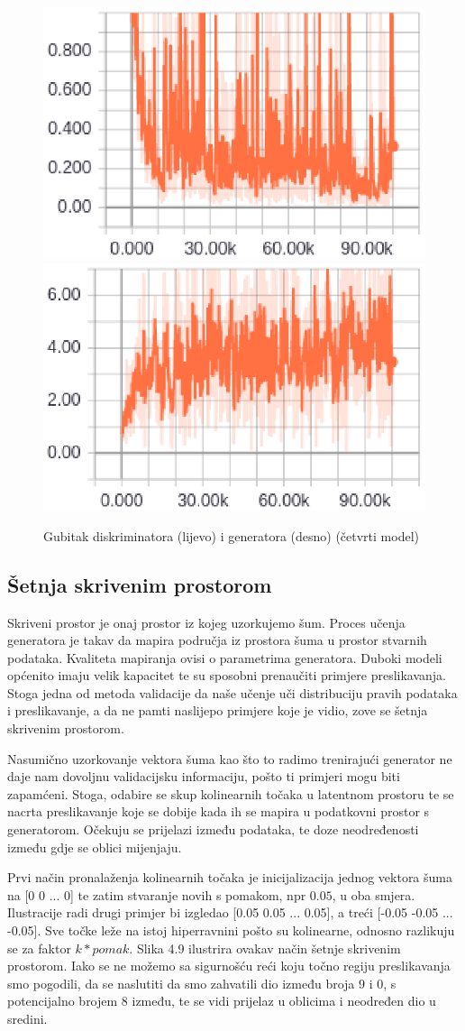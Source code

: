 \documentclass[times, utf8, diplomski]{fer}
\begin{document}
\begin{figure}[H]
\begin{center}
\includegraphics[width=.4\textwidth]{dcgandiscloss}
\includegraphics[width=.4\textwidth]{dcgangenloss}
\end{center}
\caption{Gubitak diskriminatora (lijevo) i generatora (desno) (četvrti model)}
\end{figure}

\subsection{Šetnja skrivenim prostorom}
Skriveni prostor je onaj prostor iz kojeg uzorkujemo šum. Proces učenja generatora je takav da mapira područja iz prostora šuma u prostor stvarnih podataka. Kvaliteta mapiranja ovisi o parametrima generatora. Duboki modeli općenito imaju velik kapacitet te su sposobni prenaučiti primjere preslikavanja. Stoga jedna od metoda validacije da naše učenje uči distribuciju pravih podataka i preslikavanje, a da ne pamti naslijepo primjere koje je vidio, zove se šetnja skrivenim prostorom. \par

Nasumično uzorkovanje vektora šuma kao što to radimo trenirajući generator ne daje nam dovoljnu validacijsku informaciju, pošto ti primjeri mogu biti zapamćeni. Stoga, odabire se skup kolinearnih točaka u latentnom prostoru te se nacrta preslikavanje koje se dobije kada ih se mapira u podatkovni prostor s generatorom. Očekuju se prijelazi između podataka, te doze neodređenosti između gdje se oblici mijenjaju. \par

Prvi način pronalaženja kolinearnih točaka je inicijalizacija jednog vektora šuma na [0 0 ... 0] te zatim stvaranje novih s pomakom, npr $0.05$, u oba smjera. Ilustracije radi drugi primjer bi izgledao [0.05 0.05 ... 0.05], a treći [-0.05 -0.05 ... -0.05]. Sve točke leže na istoj hiperravnini pošto su kolinearne, odnosno razlikuju se za faktor $k*pomak$. Slika 4.9 ilustrira ovakav način šetnje skrivenim prostorom. Iako se ne možemo sa sigurnošću reći koju točno regiju preslikavanja smo pogodili, da se naslutiti da smo zahvatili dio između broja $9$ i $0$, s potencijalno brojem $8$ između, te se vidi prijelaz u oblicima i neodređen dio u sredini.
\end{document}
